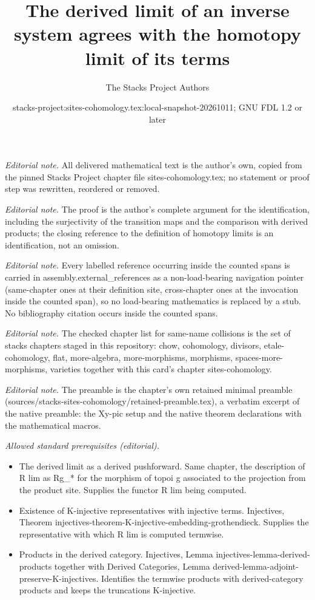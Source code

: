 \documentclass[10pt,a4paper]{amsart}
\title{The derived limit of an inverse system agrees with the homotopy limit of its terms}
\author{The Stacks Project Authors}
\date{stacks-project:sites-cohomology.tex:local-snapshot-20261011; GNU FDL 1.2 or later}
\theoremstyle{plain}
\theoremstyle{definition}
\theoremstyle{remark}
\numberwithin{equation}{subsection}
\begin{document}
\maketitle
\noindent\textit{Editorial note.} All delivered mathematical text is the author's own, copied from the pinned Stacks Project chapter file sites-cohomology.tex; no statement or proof step was rewritten, reordered or removed.\par\medskip
\noindent\textit{Editorial note.} The proof is the author's complete argument for the identification, including the surjectivity of the transition maps and the comparison with derived products; the closing reference to the definition of homotopy limits is an identification, not an omission.\par\medskip
\noindent\textit{Editorial note.} Every labelled reference occurring inside the counted spans is carried in assembly.external\_references as a non-load-bearing navigation pointer (same-chapter ones at their definition site, cross-chapter ones at the invocation inside the counted span), so no load-bearing mathematics is replaced by a stub. No bibliography citation occurs inside the counted spans.\par\medskip
\noindent\textit{Editorial note.} The checked chapter list for same-name collisions is the set of stacks chapters staged in this repository: chow, cohomology, divisors, etale-cohomology, flat, more-algebra, more-morphisms, morphisms, spaces-more-morphisms, varieties together with this card's chapter sites-cohomology.\par\medskip
\noindent\textit{Editorial note.} The preamble is the chapter's own retained minimal preamble (sources/stacks-sites-cohomology/retained-preamble.tex), a verbatim excerpt of the native preamble: the Xy-pic setup and the native theorem declarations with the mathematical macros.\par\medskip
\noindent\textit{Allowed standard prerequisites (editorial).}\begin{itemize}
\item The derived limit as a derived pushforward. Same chapter, the description of R lim as Rg\_* for the morphism of topoi g associated to the projection from the product site. Supplies the functor R lim being computed.
\item Existence of K-injective representatives with injective terms. Injectives, Theorem injectives-theorem-K-injective-embedding-grothendieck. Supplies the representative with which R lim is computed termwise.
\item Products in the derived category. Injectives, Lemma injectives-lemma-derived-products together with Derived Categories, Lemma derived-lemma-adjoint-preserve-K-injectives. Identifies the termwise products with derived-category products and keeps the truncations K-injective.
\end{itemize}\medskip
\end{document}
